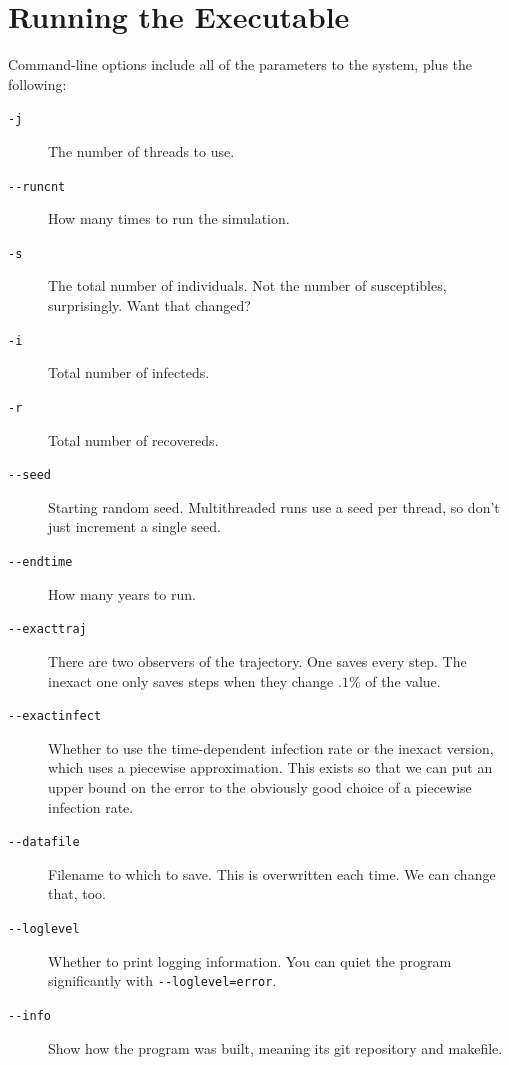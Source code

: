 \documentclass{article}
\begin{document}
\section{Running the Executable}
Command-line options include all of the parameters to the system, plus the following:
\newcommand{\opt}[1]{\texttt{#1}}
\begin{description}
  \item[\opt{-j}] The number of threads to use.
  \item[\opt{-{}-runcnt}] How many times to run the simulation.
  \item[\opt{-s}] The total number of individuals. Not the number of susceptibles,
   surprisingly. Want that changed?
  \item[\opt{-i}] Total number of infecteds.
  \item[\opt{-r}] Total number of recovereds.
  \item[\opt{-{}-seed}] Starting random seed. Multithreaded runs use a seed per thread, so don't just increment a single seed.
  \item[\opt{-{}-endtime}] How many years to run.
  \item[\opt{-{}-exacttraj}] There are two observers of the trajectory. One saves
  every step. The inexact one only saves steps when they change $.1\%$ of the value.
  \item[\opt{-{}-exactinfect}] Whether to use the time-dependent infection rate
  or the inexact version, which uses a piecewise approximation. This exists so that
  we can put an upper bound on the error to the obviously good choice of a piecewise infection rate.
  \item[\opt{-{}-datafile}] Filename to which to save. This is overwritten each time.
  We can change that, too.
  \item[\opt{-{}-loglevel}] Whether to print logging information. You can quiet the program significantly with \opt{-{}-loglevel=error}.
  \item[\opt{-{}-info}] Show how the program was built, meaning its git repository
  and makefile.
\end{description}
\end{document}

